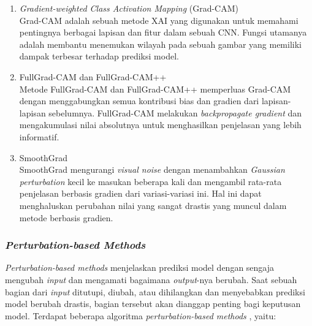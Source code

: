 \begin{enumerate}
	\item \textit{Gradient-weighted Class Activation Mapping} (Grad-CAM)\\
	Grad-CAM adalah sebuah metode XAI yang digunakan untuk memahami pentingnya berbagai lapisan dan fitur dalam sebuah CNN. Fungsi utamanya adalah membantu menemukan wilayah pada sebuah gambar yang memiliki dampak terbesar terhadap prediksi model.
	
	\item FullGrad-CAM dan FullGrad-CAM++\\
	Metode FullGrad-CAM dan FullGrad-CAM++ memperluas Grad-CAM dengan menggabungkan semua kontribusi bias dan gradien dari lapisan-lapisan sebelumnya. FullGrad-CAM melakukan \textit{backpropagate gradient} dan mengakumulasi nilai absolutnya untuk menghasilkan penjelasan yang lebih informatif. 
	
	\item SmoothGrad\\
	SmoothGrad mengurangi \textit{visual noise} dengan menambahkan \textit{Gaussian perturbation} kecil ke masukan beberapa kali dan mengambil rata-rata penjelasan berbasis gradien dari variasi-variasi ini. Hal ini dapat menghaluskan perubahan nilai yang sangat drastis yang muncul dalam metode berbasis gradien.
	
\end{enumerate}

\subsubsection{\textit{Perturbation-based Methods}}
\textit{Perturbation-based methods} menjelaskan prediksi model dengan sengaja mengubah \textit{input} dan mengamati bagaimana \textit{output}-nya berubah. Saat sebuah bagian dari \textit{input} ditutupi, diubah, atau dihilangkan dan menyebabkan prediksi model berubah drastis, bagian tersebut akan dianggap penting bagi keputusan model. Terdapat beberapa algoritma \textit{perturbation-based methods} \autocite{iftikhar2025explainable}, yaitu:

